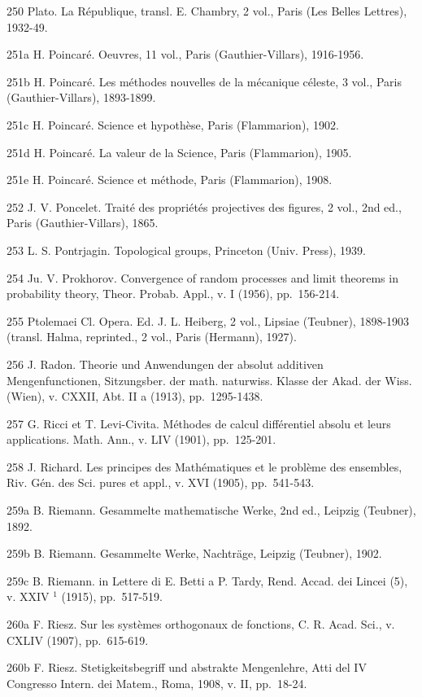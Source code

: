 250 Plato. La République, transl. E. Chambry, 2 vol., Paris (Les Belles Lettres), 1932-49.

251a H. Poincaré. Oeuvres, 11 vol., Paris (Gauthier-Villars), 1916-1956.

251b H. Poincaré. Les méthodes nouvelles de la mécanique céleste, 3 vol., Paris (Gauthier-Villars), 1893-1899.

251c H. Poincaré. Science et hypothèse, Paris (Flammarion), 1902.

251d H. Poincaré. La valeur de la Science, Paris (Flammarion), 1905.

251e H. Poincaré. Science et méthode, Paris (Flammarion), 1908.

252 J. V. Poncelet. Traité des propriétés projectives des figures, 2 vol., 2nd ed., Paris (Gauthier-Villars), 1865.

253 L. S. Pontrjagin. Topological groups, Princeton (Univ. Press), 1939.

254 Ju. V. Prokhorov. Convergence of random processes and limit theorems in probability theory, Theor. Probab. Appl., v. I (1956), pp.~156-214.

255 Ptolemaei Cl. Opera. Ed. J. L. Heiberg, 2 vol., Lipsiae (Teubner), 1898-1903 (transl. Halma, reprinted., 2 vol., Paris (Hermann), 1927).

256 J. Radon. Theorie und Anwendungen der absolut additiven Mengenfunctionen, Sitzungsber. der math. naturwiss. Klasse der Akad. der Wiss. (Wien), v. CXXII, Abt. II a (1913), pp.~1295-1438.

257 G. Ricci et T. Levi-Civita. Méthodes de calcul différentiel absolu et leurs applications. Math. Ann., v. LIV (1901), pp.~125-201.

258 J. Richard. Les principes des Mathématiques et le problème des ensembles, Riv. Gén. des Sci. pures et appl., v. XVI (1905), pp.~541-543.

259a B. Riemann. Gesammelte mathematische Werke, 2nd ed., Leipzig (Teubner), 1892.

259b B. Riemann. Gesammelte Werke, Nachträge, Leipzig (Teubner), 1902.

259c B. Riemann. in Lettere di E. Betti a P. Tardy, Rend. Accad. dei Lincei (5), v. XXIV \(^{1}\) (1915), pp.~517-519.

260a F. Riesz. Sur les systèmes orthogonaux de fonctions, C. R. Acad. Sci., v. CXLIV (1907), pp.~615-619.

260b F. Riesz. Stetigkeitsbegriff und abstrakte Mengenlehre, Atti del IV Congresso Intern. dei Matem., Roma, 1908, v. II, pp.~18-24.


